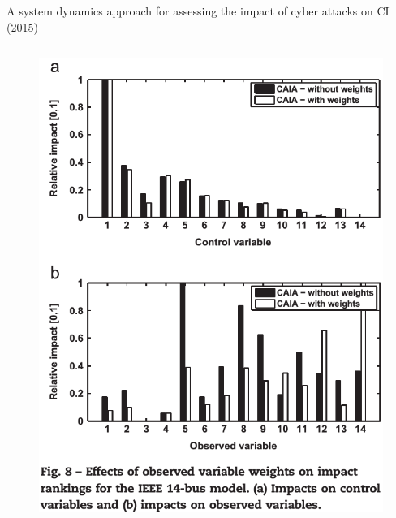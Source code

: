 \documentclass[compress]{beamer}
\begin{document}
\begin{frame}{A system dynamics approach for assessing the impact of cyber attacks on CI (2015)}
\begin{columns}
\begin{column}{0.45\textwidth}
\begin{figure}
      \includegraphics[width=1.0\textwidth]{./images/caia-param-impact.png}
      \label{fig:caia-param-impact}
      \end{figure}
     \end{column}
    \end{columns}
\end{frame}
\end{document}

